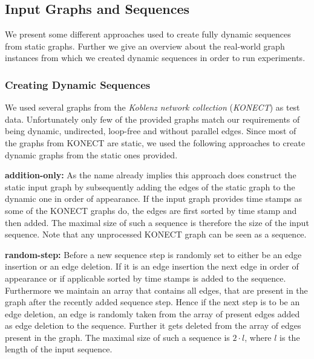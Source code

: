 \documentclass{article}      %
\begin{document}
\subsection{Input Graphs and Sequences}
\label{sec:inps-seqs}

We present some different approaches used to create fully dynamic sequences from static graphs. Further we give an overview about the real-world graph instances from which we created dynamic sequences in order to run experiments.

\subsubsection{Creating Dynamic Sequences}
\label{sec:dyn-seqs}

We used several graphs from the \emph{Koblenz network collection} (\emph{KONECT}) \cite{konect} as test data. Unfortunately only few of the provided graphs match our requirements of being dynamic, undirected, loop-free and without parallel edges. Since most of the graphs from KONECT are static, we used the following approaches to create dynamic graphs from the static ones provided. 


\bigskip \noindent
\textbf{addition-only:} As the name already implies this approach does construct the static input graph by subsequently adding the edges of the static graph to the dynamic one in order of appearance. If the input graph provides time stamps as some of the KONECT graphs do, the edges are first sorted by time stamp and then added. The maximal size of such a sequence is therefore the size of the input sequence. Note that any unprocessed KONECT graph can be seen as a sequence.

\bigskip \noindent
\textbf{random-step:} Before a new sequence step is randomly set to either be an edge insertion or an edge deletion. If it is an edge insertion the next edge in order of appearance or if applicable sorted by time stamps is added to the sequence. Furthermore we maintain an array that contains all edges, that are present in the graph after the recently added sequence step. Hence if the next step is to be an edge deletion, an edge is randomly taken from the array of present edges added as edge deletion to the sequence. Further it gets deleted from the array of edges present in the graph. The maximal size of such a sequence is $2 \cdot l$, where $l$ is the length of the input sequence.
\end{document}
